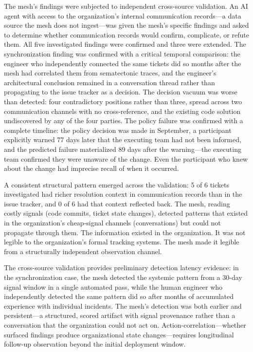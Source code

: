 \documentclass[11pt,a4paper]{article}
\begin{document}
The mesh's findings were subjected to independent cross-source validation. An AI agent with access to the organization's internal communication records---a data source the mesh does not ingest---was given the mesh's specific findings and asked to determine whether communication records would confirm, complicate, or refute them. All five investigated findings were confirmed and three were extended. The synchronization finding was confirmed with a critical temporal comparison: the engineer who independently connected the same tickets did so months after the mesh had correlated them from sematectonic traces, and the engineer's architectural conclusion remained in a conversation thread rather than propagating to the issue tracker as a decision. The decision vacuum was worse than detected: four contradictory positions rather than three, spread across two communication channels with no cross-reference, and the existing code solution undiscovered by any of the four parties. The policy failure was confirmed with a complete timeline: the policy decision was made in September, a participant explicitly warned 77 days later that the executing team had not been informed, and the predicted failure materialized 89 days after the warning---the executing team confirmed they were unaware of the change. Even the participant who knew about the change had imprecise recall of when it occurred.

A consistent structural pattern emerged across the validation: 5 of 6 tickets investigated had richer resolution context in communication records than in the issue tracker, and 0 of 6 had that context reflected back. The mesh, reading costly signals (code commits, ticket state changes), detected patterns that existed in the organization's cheap-signal channels (conversations) but could not propagate through them. The information existed in the organization. It was not legible to the organization's formal tracking systems. The mesh made it legible from a structurally independent observation channel.

The cross-source validation provides preliminary detection latency evidence: in the synchronization case, the mesh detected the systemic pattern from a 30-day signal window in a single automated pass, while the human engineer who independently detected the same pattern did so after months of accumulated experience with individual incidents. The mesh's detection was both earlier and persistent---a structured, scored artifact with signal provenance rather than a conversation that the organization could not act on. Action-correlation---whether surfaced findings produce organizational state changes---requires longitudinal follow-up observation beyond the initial deployment window.
\end{document}
